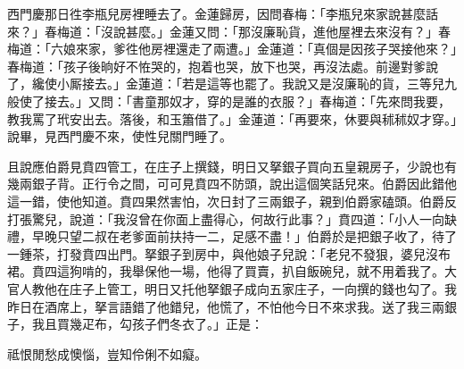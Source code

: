 西門慶那日徃李瓶兒房裡睡去了。金蓮歸房，因問春梅：「李瓶兒來家說甚麼話來？」春梅道：「沒說甚麼。」金蓮又問：「那沒廉恥貨，進他屋裡去來沒有？」春梅道：「六娘來家，爹徃他房裡還走了兩遭。」金蓮道：「真個是因孩子哭接他來？」春梅道：「孩子後晌好不恠哭的，抱着也哭，放下也哭，再沒法處。前邊對爹說了，纔使小厮接去。」金蓮道：「若是這等也罷了。我說又是沒廉恥的貨，三等兒九般使了接去。」又問：「書童那奴才，穿的是誰的衣服？」春梅道：「先來問我要，教我罵了玳安出去。落後，和玉簫借了。」金蓮道：「再要來，休要與秫秫奴才穿。」說畢，見西門慶不來，使性兒關門睡了。

且說應伯爵見賁四管工，在庄子上撰錢，明日又拏銀子買向五皇親房子，少說也有幾兩銀子背。正行令之間，可可見賁四不防頭，說出這個笑話兒來。伯爵因此錯他這一錯，使他知道。賁四果然害怕，次日封了三兩銀子，親到伯爵家磕頭。伯爵反打張驚兒，說道：「我沒曾在你面上盡得心，何故行此事？」賁四道：「小人一向缺禮，早晚只望二叔在老爹面前扶持一二，足感不盡！」伯爵於是把銀子收了，待了一鍾茶，打發賁四出門。拏銀子到房中，與他娘子兒說：「老兒不發狠，婆兒沒布裙。賁四這狗啃的，我舉保他一場，他得了買賣，扒自飯碗兒，就不用着我了。大官人教他在庄子上管工，明日又托他拏銀子成向五家庄子，一向撰的錢也勾了。我昨日在酒席上，拏言語錯了他錯兒，他慌了，不怕他今日不來求我。送了我三兩銀子，我且買幾疋布，勾孩子們冬衣了。」正是：

\begin{myquote} 
祗恨閒愁成懊惱，豈知伶俐不如癡。
\end{myquote} 

